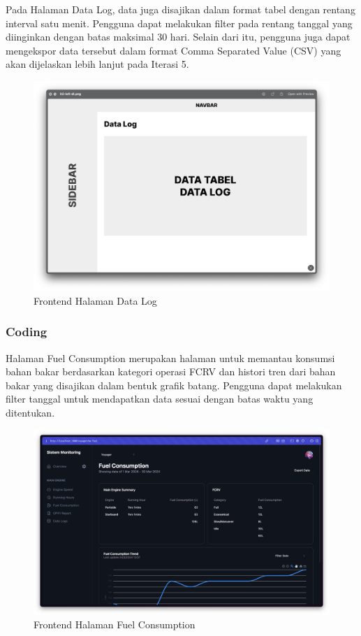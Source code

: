 \newpage

Pada Halaman Data Log, data juga disajikan dalam format tabel dengan rentang interval satu menit. Pengguna dapat melakukan filter pada rentang tanggal yang diinginkan dengan batas maksimal 30 hari. Selain dari itu, pengguna juga dapat mengekspor data tersebut dalam format Comma Separated Value (CSV) yang akan dijelaskan lebih lanjut pada Iterasi 5.

\begin{figure}[!h]
    \includegraphics[width=1.05\linewidth, center]{images/hasil/iterations/2/lofi-dl.png}
    \caption{Frontend Halaman Data Log}
    \label{fig:lofi-dl}
\end{figure}

\newpage

\subsubsection{Coding}

Halaman Fuel Consumption merupakan halaman untuk memantau konsumsi bahan bakar berdasarkan kategori operasi FCRV dan histori tren dari bahan bakar yang disajikan dalam bentuk grafik batang. Pengguna dapat melakukan filter tanggal untuk mendapatkan data sesuai dengan batas waktu yang ditentukan.

\begin{figure}[!h]
    \includegraphics[width=1.05\linewidth, center]{images/hasil/iterations/2/fe-fc.png}
    \caption{Frontend Halaman Fuel Consumption}
    \label{fig:fe-fc}
\end{figure}

